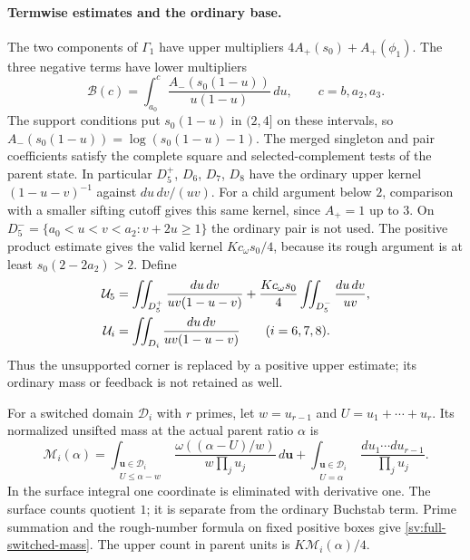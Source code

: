 \paragraph{Termwise estimates and the ordinary base.}
The two components of $\Gamma_1$ have upper multipliers
$4A_+(s_0)+A_+(\phi_1)$.  The three negative terms have lower
multipliers
\begin{equation}\label{sv:negative-singleton-base}
 \mathcal B(c)=\int_{a_0}^{c}
   \frac{A_-(s_0(1-u))}{u(1-u)}\,du,
 \qquad c=b,a_2,a_3.
\end{equation}
The support conditions put $s_0(1-u)$ in $(2,4]$ on these intervals,
so $A_-(s_0(1-u))=\log(s_0(1-u)-1)$.
The merged singleton and pair coefficients satisfy the complete
square and selected-complement tests of the parent state.  In
particular $D_5^+$, $D_6$, $D_7$, $D_8$ have the ordinary upper
kernel $(1-u-v)^{-1}$ against $du\,dv/(uv)$.
For a child argument below $2$, comparison with a smaller sifting
cutoff gives this same kernel, since $A_+=1$ up to $3$.
On
$D_5^-=\{a_0<u<v<a_2:v+2u\ge1\}$ the ordinary pair is not used.
The positive product estimate gives the valid kernel
$Kc_\omega s_0/4$, because its rough argument is at least
$s_0(2-2a_2)>2$.  Define
\begin{align}\label{sv:pair-base}
 \mathcal U_5&=
  \iint_{D_5^+}\frac{du\,dv}{uv(1-u-v)}
   +\frac{Kc_\omega s_0}{4}\iint_{D_5^-}\frac{du\,dv}{uv},\notag\\
 \mathcal U_i&=\iint_{D_i}\frac{du\,dv}{uv(1-u-v)}
                  \qquad(i=6,7,8).
\end{align}
Thus the unsupported corner is replaced by a positive upper
estimate; its ordinary mass or feedback is not retained as well.

For a switched domain $\mathcal D_i$ with $r$ primes, let
$w=u_{r-1}$ and $U=u_1+\cdots+u_r$.  Its normalized unsifted
mass at the actual parent ratio $\alpha$ is
\begin{equation}\label{sv:full-switched-mass}
 \mathcal M_i(\alpha)=
 \int_{\substack{\boldsymbol u\in\mathcal D_i\\U\le\alpha-w}}
 \frac{\omega((\alpha-U)/w)}{w\prod_j u_j}\,d\boldsymbol u
 +\int_{\substack{\boldsymbol u\in\mathcal D_i\\U=\alpha}}
                     \frac{du_1\cdots du_{r-1}}{\prod_j u_j}.
\end{equation}
In the surface integral one coordinate is eliminated with derivative
one.  The surface counts quotient $1$; it is separate from the
ordinary Buchstab term.  Prime summation and the rough-number
formula on fixed positive boxes give \eqref{sv:full-switched-mass}.
The upper count in parent units is $K\mathcal M_i(\alpha)/4$.

